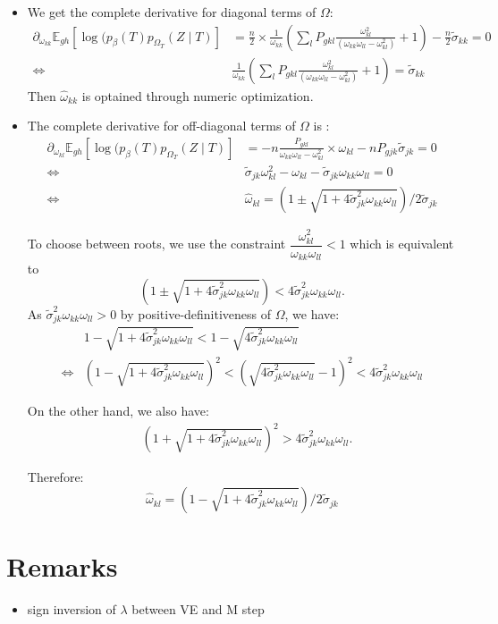 \documentclass[11pt,a4paper]{article}
\newcommand{\Esp}{\mathds{E}}
\begin{document}
\begin{itemize}
\item We get the complete derivative for diagonal terms of $\Omega$:
\begin{align*}
 \partial_{\omega_{kk}}\Esp_{gh} [\log (p_\beta(T)p_{\Omega_T}(Z\mid T) ] &=\frac{n}{2} \times\frac{1}{\omega_{kk}} \left(\sum_l P_{gkl} \frac{\omega_{kl}^2}{(\omega_{kk}\omega_{ll}-\omega_{kl}^2)} + 1\right) -\frac{n}{2}\widetilde{\sigma}_{kk} =0\\
 \iff & \boxed{ \frac{1}{\omega_{kk}} \left(\sum_l P_{gkl} \frac{\omega_{kl}^2}{(\omega_{kk}\omega_{ll}-\omega_{kl}^2)} + 1\right) =\widetilde{\sigma}_{kk}}
\end{align*}
Then $\widehat{\omega}_{kk}$ is optained through numeric optimization.\\

\item The complete derivative for off-diagonal terms of $\Omega$ is :
\begin{align*}
 \partial_{\omega_{kl}}\Esp_{gh} [\log (p_\beta(T)p_{\Omega_T}(Z\mid T) ] &=-n \frac{P_{gkl} }{\omega_{kk}\omega_{ll}-\omega_{kl}^2}\times \omega_{kl} - n P_{gjk}  \widetilde{\sigma}_{jk} =0\\
 \iff & \widetilde{\sigma}_{jk} \omega_{kl}^2 - \omega_{kl} - \widetilde{\sigma}_{jk} \omega_{kk}\omega_{ll} = 0 \\
 \iff & \widehat{\omega}_{kl} = (1 \pm \sqrt{1+4\widetilde{\sigma}_{jk}^2 \omega_{kk}\omega_{ll}}) / 2\widetilde{\sigma}_{jk}
\end{align*}

To choose between roots, we use the constraint $\dfrac{\omega_{kl}^2}{\omega_{kk}\omega_{ll}} < 1$ which is equivalent to 
$$ (1 \pm \sqrt{1+4\widetilde{\sigma}_{jk}^2 \omega_{kk}\omega_{ll}}) < 4\widetilde{\sigma}_{jk}^2 \omega_{kk}\omega_{ll}.$$
As $\widetilde{\sigma}_{jk}^2 \omega_{kk}\omega_{ll} > 0$ by positive-definitiveness of $\Omega$, we have:
\begin{align*}
&1 - \sqrt{1+4\widetilde{\sigma}_{jk}^2 \omega_{kk}\omega_{ll}} < 1- \sqrt{4\widetilde{\sigma}_{jk}^2 \omega_{kk}\omega_{ll}}\\
\iff &(1 - \sqrt{1+4\widetilde{\sigma}_{jk}^2 \omega_{kk}\omega_{ll}})^2 < ( \sqrt{4\widetilde{\sigma}_{jk}^2 \omega_{kk}\omega_{ll}}-1)^2 < 4\widetilde{\sigma}_{jk}^2 \omega_{kk}\omega_{ll}
\end{align*}

On the other hand, we also have:
\begin{align*}
&(1 + \sqrt{1+4\widetilde{\sigma}_{jk}^2 \omega_{kk}\omega_{ll}})^2 >4\widetilde{\sigma}_{jk}^2 \omega_{kk}\omega_{ll}.
\end{align*}

Therefore: $$\boxed{ \widehat{\omega}_{kl} = (1 - \sqrt{1+4\widetilde{\sigma}_{jk}^2 \omega_{kk}\omega_{ll}}) / 2\widetilde{\sigma}_{jk}}$$

\end{itemize}


\section*{Remarks}
\begin{itemize}
\item sign inversion of $\lambda$ between VE and M step 
\end{itemize}

\newpage

\end{document}

